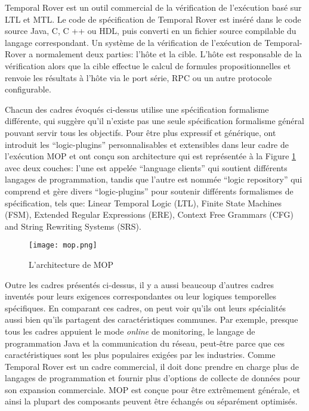 Temporal Rover \citep{drusinsky2000temporal} est un outil commercial de la vérification de l'exécution basé sur LTL et MTL. Le code de spécification de Temporal Rover est inséré dans le code source Java, C, C ++ ou HDL, puis converti en un fichier source compilable du langage correspondant. Un système de la vérification de l'exécution de Temporal-Rover a normalement deux parties: l'hôte et la cible. L'hôte est responsable de la vérification alors que la cible effectue le calcul de formules propositionnelles et renvoie les résultats à l'hôte via le port série, RPC ou un autre protocole configurable.

Chacun des cadres évoqués ci-dessus utilise une spécification formalisme différente, qui suggère qu'il n'existe pas une seule spécification formalisme général pouvant servir tous les objectifs. Pour être plus expressif et générique, \cite{chen2007mop} ont introduit les ``logic-plugins'' personnalisables et extensibles dans leur cadre de l'exécution MOP et ont conçu son architecture qui est représentée à la Figure \ref{img:mop} avec deux couches: l'une est appelée ``language clients'' qui soutient différents langages de programmation, tandis que l'autre est nommée ``logic repository'' qui comprend et gère divers ``logic-plugins'' pour soutenir différents formalismes de spécification, tels que: Linear Temporal Logic (LTL), Finite State Machines (FSM), Extended Regular Expressions (ERE), Context Free Grammars (CFG) and String Rewriting Systems (SRS).

\begin{figure}[h]
\begin{center}
\centering
\texttt{[image: mop.png]}
\caption{L'architecture de MOP \citep{chen2007mop}}
\label{img:mop}
\end{center}
\end{figure}

Outre les cadres présentés ci-dessus, il y a aussi beaucoup d'autres cadres inventés pour leurs exigences correspondantes ou leur logiques temporelles spécifiques. En comparant ces cadres, on peut voir qu'ils ont leurs spécialités aussi bien qu'ils partagent des caractéristiques communes. Par exemple, presque tous les cadres appuient le mode \emph{online} de monitoring, le langage de programmation Java et la communication du réseau, peut-être parce que ces caractéristiques sont les plus populaires exigées par les industries. Comme Temporal Rover est un cadre commercial, il doit donc prendre en charge plus de langages de programmation et fournir plus d'options de collecte de données pour son expansion commerciale. MOP est conçue pour être extrêmement générale, et ainsi la plupart des composants peuvent être échangés ou séparément optimisés.
